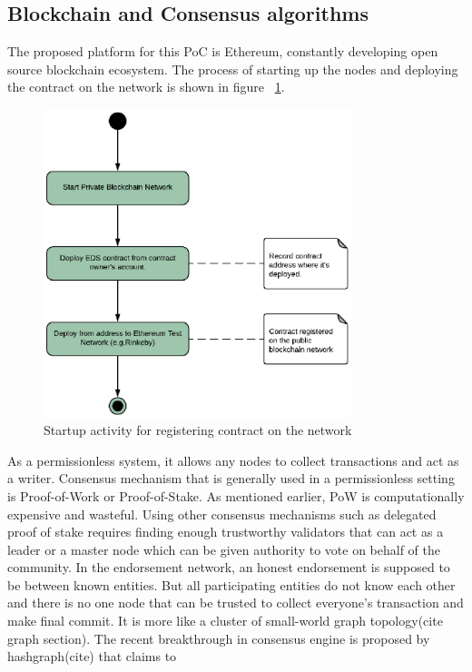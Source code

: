 \subsection{Blockchain and Consensus algorithms}
The proposed platform for this PoC is Ethereum, constantly developing open
source blockchain ecosystem. The process of starting up the nodes and deploying
the contract on the network is shown in figure ~\ref{fig:startup}.
\begin{figure}
	\centering
	\includegraphics[width=0.8\textwidth]{Images/ActivityDiagramStartUpBC.eps}
	\caption{Startup activity for registering contract on the network}
	\label{fig:startup}
\end{figure}
As a permissionless system, it allows any nodes to
collect transactions and act as a writer. Consensus mechanism that is generally
used in a permissionless setting is Proof-of-Work or Proof-of-Stake. As
mentioned earlier, PoW is computationally expensive and wasteful. Using other
consensus mechanisms such as delegated proof of stake requires finding enough
trustworthy validators that can act as a leader or a master node which can be
given authority to vote on behalf of the community. In the endorsement network,
an honest endorsement is supposed to be between known entities. But all
participating entities do not know each other and there is no one node that can
be trusted to collect everyone's transaction and make final commit. It is more
like a cluster of small-world graph topology(cite graph section). The recent
breakthrough in consensus engine is proposed by hashgraph(cite) that claims to
